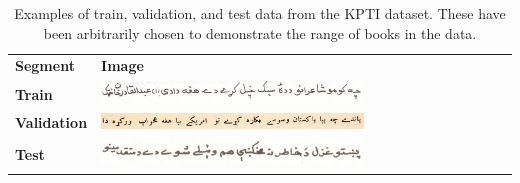 \documentclass[twocolumn,11pt]{extarticle}
\begin{document}
\begin{table}[H]
\begin{tabular}{|l|l|ll}
\cline{1-2}
\textbf{Segment}             & \textbf{Image} &  &  \\ \cline{1-2}
\textbf{Train}               & \includegraphics[width=0.7\textwidth]{images/PasPo-0066-23.jpg}             &  &  \\ \cline{1-2}
\textbf{Validation}            &  \includegraphics[width=0.7\textwidth]{images/Abasn-0002-4.jpg}              &  &  \\ \cline{1-2}
\textbf{Test}            & \includegraphics[width=0.7\textwidth]{images/KhKul-0003-4.jpg}               &  &  \\ \cline{1-2}
\end{tabular}
\caption{Examples of train, validation, and test data from the KPTI dataset. These have been arbitrarily chosen to demonstrate the range of books in the data.}
\label{table:kpti_examples}
\end{table}
\end{document}
